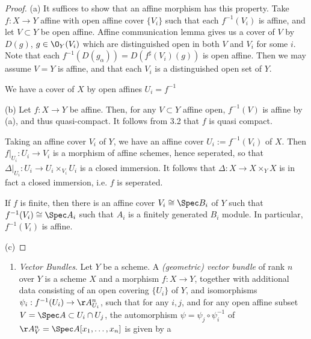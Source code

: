 \documentclass[12pt]{amsart}
\begin{document}
\begin{proof}
  (a) It suffices to show that an affine morphism has this property.
  Take $f:X\to Y$ affine with open affine cover $\{V_i\}$ such that each $f^{-1}(V_i)$ is affine, and let $V\subset Y$ be open affine.
  Affine communication lemma gives us a cover of $V$ by $D(g)$, $g\in \O_Y(V_i)$ which are distinguished open in both $V$ and $V_i$ for some $i$.
  Note that each $f^{-1}(D(g_\alpha))= D(f^\sharp(V_i)(g))$ is open affine.
  Then we may assume $V=Y$ is affine, and that each $V_i$ is a distinguished open set of $Y$.

  We have a cover of $X$ by open affines $U_i=f^{-1}$

  (b) Let $f:X\to Y$ be affine. 
  Then, for any $V\subset Y$ affine open, $f^{-1}(V)$ is affine by (a), and thus quasi-compact.
  It follows from 3.2 that $f$ is quasi compact.

  Taking an affine cover $V_i$ of $Y$, we have an affine cover $U_i:=f^{-1}(V_i)$ of $X$.
  Then $f|_{U_i}:U_i\to V_i$ is a morphism of affine schemes, hence seperated, so that $\Delta|_{U_i}:U_i\to U_i\times_{V_i}U_i$ is a closed immersion.
  It follows that $\Delta:X\to X\times_YX$ is in fact a closed immersion, i.e. $f$ is seperated.
  
  If $f$ is finite, then there is an affine cover $V_i\cong \Spec B_i$ of $Y$ such that $f^{-1}(V_i)\cong \Spec A_i$ such that $A_i$ is a finitely generated $B_i$ module.
  In particular, $f^{-1}(V_i)$ is affine.

  (c)
\end{proof}

\begin{enumerate}
  \item[5.18.] {
      \emph{Vector Bundles}. Let $Y$ be a scheme.
      A \emph{(geometric) vector bundle} of rank $n$ over $Y$ is a scheme $X$ and a morphism $f:X\to Y$, together with additional data consisting of an open covering $\{U_i\}$ of $Y$, and isomorphisms $\psi_i:f^{-1}(U_i)\to \AA_{U_i}^n$, such that for any $i,j$, and for any open affine subset $V=\Spec A\subset U_{i}\cap U_j$, the automorphism $\psi=\psi_j\circ \psi_i^{-1}$ of $\AA_V^n=\Spec A[x_1,\ldots,x_n]$ is given by a 
    }
\end{enumerate}
\end{document}
